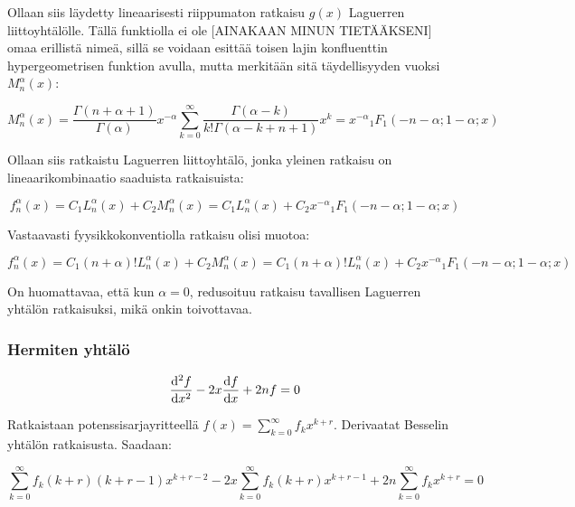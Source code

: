 \documentclass[../johdoksia.tex]{subfiles}
\begin{document}
	Ollaan siis läydetty lineaarisesti riippumaton ratkaisu $g(x)$ Laguerren liittoyhtälölle. Tällä funktiolla ei ole [AINAKAAN MINUN TIETÄÄKSENI] omaa erillistä nimeä, sillä se voidaan esittää toisen lajin konfluenttin hypergeometrisen funktion avulla, mutta merkitään sitä täydellisyyden vuoksi $M_{n}^{\alpha}(x)$:
	
	\begin{equation}
		\boxed{M_n^{\alpha}(x) = \frac{\Gamma(n + \alpha + 1)}{\Gamma(\alpha)}x^{-\alpha}\sum_{k = 0}^{\infty}\frac{\Gamma(\alpha - k)}{k!\Gamma(\alpha - k + n + 1)}x^k = x^{-\alpha}{_1{F}_1}(- n - \alpha; 1 - \alpha ; x)}
	\end{equation}

	Ollaan siis ratkaistu Laguerren liittoyhtälö, jonka yleinen ratkaisu on lineaarikombinaatio saaduista ratkaisuista:

	\begin{equation}
		\boxed{f_{n}^{\alpha}(x) = C_1L_{n}^\alpha(x) + C_2M_{n}^{\alpha}(x) = C_1L_{n}^\alpha(x) + C_2x^{-\alpha}{_1{F}_1}(- n - \alpha; 1 - \alpha ; x)}
	\end{equation} 

	Vastaavasti fyysikkokonventiolla ratkaisu olisi muotoa:
	
	\begin{equation}
		\boxed{f_{n}^{\alpha}(x) = C_1(n + \alpha)!L_{n}^\alpha(x) + C_2M_{n}^{\alpha}(x) = C_1(n + \alpha)!L_{n}^\alpha(x) + C_2x^{-\alpha}{_1{F}_1}(- n - \alpha; 1 - \alpha ; x)}
	\end{equation} 

	On huomattavaa, että kun $\alpha = 0$, redusoituu ratkaisu tavallisen Laguerren yhtälön ratkaisuksi, mikä onkin toivottavaa.
	
	\subsubsection{Hermiten yhtälö}
	
	\begin{equation}
		\odv{^2f}{x^2} - 2x\odv{f}{x} + 2nf = 0
	\end{equation}

	Ratkaistaan potenssisarjayritteellä $f(x) = \sum_{k = 0}^{\infty}f_kx^{k + r}$. Derivaatat Besselin yhtälön ratkaisusta. Saadaan:
	
	\begin{equation*}
		\sum_{k = 0}^{\infty}f_k(k + r)(k + r - 1)x^{k + r - 2} - 2x\sum_{k = 0}^{\infty}f_k(k + r)x^{k + r - 1} + 2n\sum_{k = 0}^{\infty}f_kx^{k + r} = 0
	\end{equation*}
	
\end{document}

